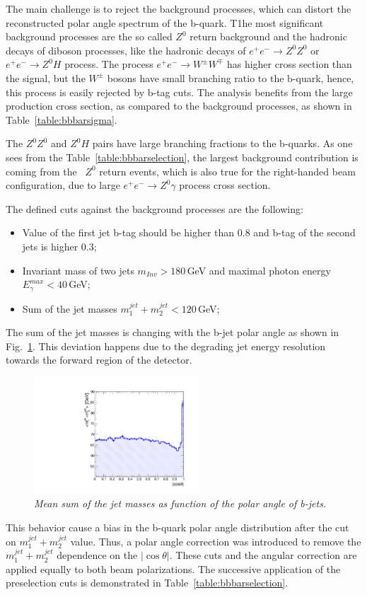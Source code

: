 The main challenge is to reject the background processes, which can distort the reconstructed polar angle spectrum of the b-quark. 
T1he most significant background processes are the so called $Z^0$ return background and the hadronic decays of diboson processes, like the hadronic decays of $e^+e^-\to Z^0Z^0$ or $e^+e^-\to Z^0H$ process. The process $e^+e^-\to W^\pm W^\mp$ has higher cross section than the signal, but the $W^\pm$ bosons have small branching ratio to the b-quark, hence, this process is easily rejected by b-tag cuts. 
The analysis benefits from the large production cross section, as compared to the background processes, as shown in Table~\ref{table:bbbarsigma}.

The $Z^0Z^0$ and $Z^0H$ pairs have large branching fractions to the b-quarks. 
As one sees from the Table~\ref{table:bbbarselection}, the largest background contribution is coming from the \bbbar\ $Z^0$ return events, which is also true for the right-handed beam configuration, due to large $e^+e^-\to Z^0\gamma$ process cross section.

The defined cuts against the background processes are the following:
\begin{itemize}
	\item Value of the first jet b-tag should be higher than 0.8 and b-tag of the second jets is higher 0.3;
	\item Invariant mass of two jets $m_{Inv} > 180$\,GeV and maximal photon energy $E^{max}_\gamma < 40$\,GeV;
	\item Sum of the jet masses $m^{jet}_1+m^{jet}_2<120$\,GeV;
\end{itemize}
The sum of the jet masses is changing with the b-jet polar angle as shown in Fig.~\ref{fig:JetMasses_3}. This deviation happens due to the degrading jet energy resolution towards the forward region of the detector. 
\begin{figure}
	{\centering
		\includegraphics[width=0.55\textwidth]{ILD/plots/mass-correction.pdf}
		\caption{\sl Mean sum of the jet masses as function of the polar angle of b-jets.   
		}
		\label{fig:JetMasses_3}
	}
	
\end{figure}
This behavior cause a bias in the b-quark polar angle distribution after the cut on  $m^{jet}_1+m^{jet}_2$ value. 
Thus, a polar angle correction was introduced to remove the $m^{jet}_1+m^{jet}_2$ dependence on the $|\cos\theta|$.
These cuts and the angular correction are applied equally to both beam polarizations.
The successive application of the preselection cuts is demonstrated in Table~\ref{table:bbbarselection}.

